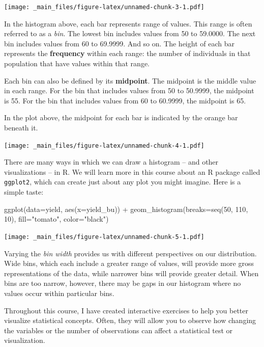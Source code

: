 \documentclass[
]{book}
\newenvironment{Shaded}{\begin{snugshade}}{\end{snugshade}}
\newcommand{\AttributeTok}[1]{\textcolor[rgb]{0.77,0.63,0.00}{#1}}
\newcommand{\DecValTok}[1]{\textcolor[rgb]{0.00,0.00,0.81}{#1}}
\newcommand{\FunctionTok}[1]{\textcolor[rgb]{0.00,0.00,0.00}{#1}}
\newcommand{\NormalTok}[1]{#1}
\newcommand{\SpecialCharTok}[1]{\textcolor[rgb]{0.00,0.00,0.00}{#1}}
\newcommand{\StringTok}[1]{\textcolor[rgb]{0.31,0.60,0.02}{#1}}
\begin{document}
\texttt{[image: \_main\_files/figure-latex/unnamed-chunk-3-1.pdf]}

In the histogram above, each bar represents range of values. This range
is often referred to as a \emph{bin}. The lowest bin includes values from 50
to 59.0000. The next bin includes values from 60 to 69.9999. And so on.
The height of each bar represents the \textbf{frequency} within each range:
the number of individuals in that population that have values within
that range.

Each bin can also be defined by its \textbf{midpoint}. The midpoint is the
middle value in each range. For the bin that includes values from 50 to
50.9999, the midpoint is 55. For the bin that includes values from 60 to
60.9999, the midpoint is 65.

In the plot above, the midpoint for each bar is indicated by the orange
bar beneath it.

\texttt{[image: \_main\_files/figure-latex/unnamed-chunk-4-1.pdf]}

There are many ways in which we can draw a histogram -- and other
visualizations -- in R. We will learn more in this course about an R
package called \texttt{ggplot2}, which can create just about any plot you might
imagine. Here is a simple taste:

\begin{Shaded}
\begin{Highlighting}[]
\FunctionTok{ggplot}\NormalTok{(}\AttributeTok{data=}\NormalTok{yield, }\FunctionTok{aes}\NormalTok{(}\AttributeTok{x=}\NormalTok{yield\_bu)) }\SpecialCharTok{+}
  \FunctionTok{geom\_histogram}\NormalTok{(}\AttributeTok{breaks=}\FunctionTok{seq}\NormalTok{(}\DecValTok{50}\NormalTok{, }\DecValTok{110}\NormalTok{, }\DecValTok{10}\NormalTok{), }\AttributeTok{fill=}\StringTok{"tomato"}\NormalTok{, }\AttributeTok{color=}\StringTok{"black"}\NormalTok{)}
\end{Highlighting}
\end{Shaded}

\texttt{[image: \_main\_files/figure-latex/unnamed-chunk-5-1.pdf]}

Varying the \emph{bin width} provides us with different perspectives on our
distribution. Wide bins, which each include a greater range of values,
will provide more gross representations of the data, while narrower bins
will provide greater detail. When bins are too narrow, however, there
may be gaps in our histogram where no values occur within particular
bins.

Throughout this course, I have created interactive exercises to help you
better visualize statistical concepts. Often, they will allow you to
observe how changing the variables or the number of observations can
affect a statistical test or visualization.
\end{document}
